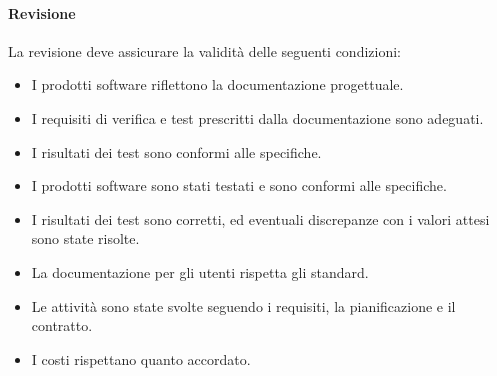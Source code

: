 \documentclass[../../norme-di-progetto.tex]{subfiles}
\begin{document}
\paragraph{Revisione}%
\label{par:revisione}
La revisione deve assicurare la validità delle seguenti condizioni:

\begin{itemize}
  \item I prodotti software riflettono la documentazione progettuale.
  \item I requisiti di verifica e test prescritti dalla documentazione sono adeguati.
  \item I risultati dei test sono conformi alle specifiche.
  \item I prodotti software sono stati testati e sono conformi alle specifiche.
  \item I risultati dei test sono corretti, ed eventuali discrepanze con i valori attesi sono state risolte.
  \item La documentazione per gli utenti rispetta gli standard.
  \item Le attività sono state svolte seguendo i requisiti, la pianificazione e il contratto.
  \item I costi rispettano quanto accordato.
\end{itemize}



\end{document}
